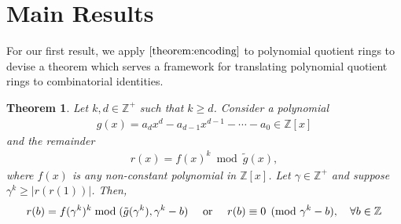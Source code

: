 \documentclass[12pt,reqno]{article}
\theoremstyle{plain}
\newtheorem{theorem}{Theorem}
\theoremstyle{definition}
\begin{document}
\section{Main Results} \label{section:results}
For our first result, we apply $\cref{theorem:encoding}$ to polynomial quotient rings to devise a theorem which serves a framework for translating polynomial quotient rings to combinatorial identities.

\begin{theorem} \label{theorem:kroneckerqrings}
Let $k, d \in \mathbb{Z}^+$ such that $k \geq d$. Consider a polynomial
\begin{align*}
g(x) = a_d x^d - a_{d-1} x^{d-1} - \cdots - a_0 \in \mathbb{Z}[x]
\end{align*}
and the remainder
\begin{align*}
r(x) = f(x)^k  \bmod{\tilde{g}(x)} ,
\end{align*}
where $f(x)$ is any non-constant polynomial in $\mathbb{Z}[x]$. Let $\gamma \in \mathbb{Z}^+$ and suppose $\gamma^k \geq |r(r(1))|$. Then,
\begin{align*}
r(b) = f(\gamma^k)^k \bmod{(\tilde{g}(\gamma^k), \gamma^k - b)} \quad \textup{ or } \quad r(b) \equiv 0 \pmod{\gamma^k - b}, \quad \forall b \in \mathbb{Z}
\end{align*}

\end{theorem}
\end{document}
